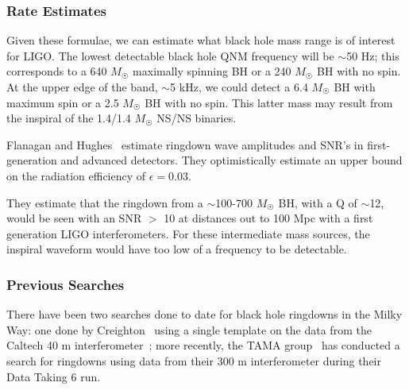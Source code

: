 \subsubsection{Rate Estimates}

Given these formulae, we can estimate what black hole mass range is of interest for
LIGO. The lowest detectable black hole QNM frequency will be $\sim$50 Hz; this
corresponds to a 640 $M_{\astrosun}$ maximally spinning BH or a 240 $M_{\astrosun}$
BH with no spin. At the upper edge of the band, $\sim$5 kHz, we could detect a
6.4 $M_{\astrosun}$ BH with maximum spin or a 2.5 $M_{\astrosun}$ BH with no spin. 
This latter mass may result from the inspiral of the
1.4/1.4 $M_{\astrosun}$ NS/NS binaries.

Flanagan and Hughes~\cite{Scott:RD} estimate ringdown wave amplitudes
and SNR's in first-generation and advanced detectors. They optimistically
estimate an upper bound on the radiation efficiency of $\epsilon = 0.03$.

They estimate that the ringdown from a $\sim$100-700 $M_{\astrosun}$ BH, with
a Q of $\sim$12, would be seen with an SNR $>$ 10 at distances out to 100 Mpc
with a first generation LIGO interferometers. For these intermediate mass sources, 
the inspiral waveform would have too low of a frequency to be detectable.


\subsubsection{Previous Searches}

There have been two searches done to date for black hole ringdowns in 
the Milky Way:  one done by Creighton~\cite{Jolien:40m} using a single template 
on the data from the Caltech 40 m interferometer~\cite{40m:Inspiral}; 
more recently, the TAMA group~\cite{TAMA:RD} has conducted a search for ringdowns
using data from their 300 m interferometer during their Data Taking 6 run.

